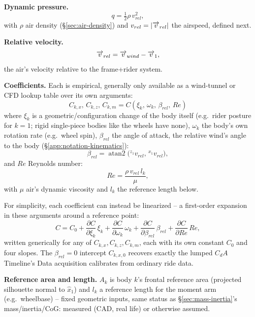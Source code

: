 \textbf{Dynamic pressure.}
\begin{equation}
    q = \tfrac{1}{2}\rho\,v_{rel}^2,
\end{equation}
with $\rho$ air density (\S\ref{sec:air-density}) and $v_{rel}=|\overrightarrow{v}_{rel}|$ the airspeed, defined next.

\textbf{Relative velocity.}
\begin{equation}
    \overrightarrow{v}_{rel} = \overrightarrow{v}_{wind} - \overrightarrow{v}_1,
\end{equation}
the air's velocity relative to the frame+rider system.

\textbf{Coefficients.} Each is empirical, generally only available as a wind-tunnel or CFD lookup table over its own arguments:
\begin{equation}
    C_{k,x},\,C_{k,z},\,C_{k,m} = C(\xi_k,\,\omega_k,\,\beta_{rel},\,Re)
\end{equation}
where $\xi_k$ is a geometric/configuration change of the body itself (e.g.\ rider posture for $k=1$; rigid single-piece bodies like the wheels have none), $\omega_k$ the body's own rotation rate (e.g.\ wheel spin), $\beta_{rel}$ the angle of attack, the relative wind's angle to the body (\S\ref{app:notation-kinematics}):
\begin{equation}
    \beta_{rel} = \operatorname{atan2}\!\big({}^{z_1}v_{rel},\,{}^{x_1}v_{rel}\big),
\end{equation}
and $Re$ Reynolds number:
\begin{equation}
    Re = \frac{\rho\,v_{rel}\,l_k}{\mu},
\end{equation}
with $\mu$ air's dynamic viscosity and $l_k$ the reference length below.

For simplicity, each coefficient can instead be linearized -- a first-order expansion in these arguments around a reference point:
\begin{equation}
    C = C_0 + \frac{\partial C}{\partial \xi_k}\,\xi_k + \frac{\partial C}{\partial \omega_k}\,\omega_k + \frac{\partial C}{\partial \beta_{rel}}\,\beta_{rel} + \frac{\partial C}{\partial Re}\,Re,
\end{equation}
written generically for any of $C_{k,x},C_{k,z},C_{k,m}$, each with its own constant $C_0$ and four slopes. The $\beta_{rel}=0$ intercept $C_{k,x,0}$ recovers exactly the lumped $C_dA$ Timeline's Data acquisition calibrates from ordinary ride data.

\textbf{Reference area and length.} $A_k$ is body $k$'s frontal reference area (projected silhouette normal to $\hat x_1$) and $l_k$ a reference length for the moment arm (e.g.\ wheelbase) -- fixed geometric inputs, same status as \S\ref{sec:mass-inertia}'s mass/inertia/CoG: measured (CAD, real life) or otherwise assumed.

